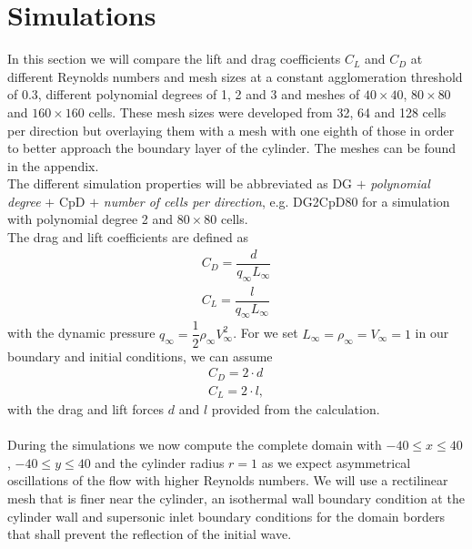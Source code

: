 \section{Simulations}
	In this section we will compare the lift and drag coefficients $C_L$ and $C_D$ at different Reynolds numbers and mesh sizes at a constant agglomeration threshold of $0.3$, different polynomial degrees of 1, 2 and 3 and meshes of $40 \times 40$, $80 \times 80$ and $160 \times 160$ cells. These mesh sizes were developed from 32, 64 and 128 cells per direction but overlaying them with a mesh with one eighth of those in order to better approach the boundary layer of the cylinder. The meshes can be found in the appendix. \\\indent
	The different simulation properties will be abbreviated as DG $+$ \textit{polynomial degree} $+$ CpD $+$ \textit{number of cells per direction}, e.g. DG2CpD80 for a simulation with polynomial degree 2 and $80 \times 80$ cells.\\
	 The drag and lift coefficients are defined as
	\begin{align}
		C_D = \dfrac{d}{q_\infty L_\infty} \\
		C_L = \dfrac{l}{q_\infty L_\infty}
	\end{align}
	with the dynamic pressure $q_\infty = \dfrac{1}{2} \rho_\infty V_\infty^2$. For we set $L_\infty = \rho_\infty = V_\infty = 1$ in our boundary and initial conditions, we can assume
	\begin{align}
		C_D = 2 \cdot d \\
		C_L = 2 \cdot l,
	\end{align}
	with the drag and lift forces $d$ and $l$ provided from the calculation. \\\\
	During the simulations we now compute the complete domain with $-40 \leq x \leq 40$, $-40 \leq y \leq 40$ and the cylinder radius $r = 1$ as we expect asymmetrical oscillations of the flow with higher Reynolds numbers.
	We will use a rectilinear mesh that is finer near the cylinder, an isothermal wall boundary condition at the cylinder wall and supersonic inlet boundary conditions for the domain borders that shall prevent the reflection of the initial wave.  \\\\
	
